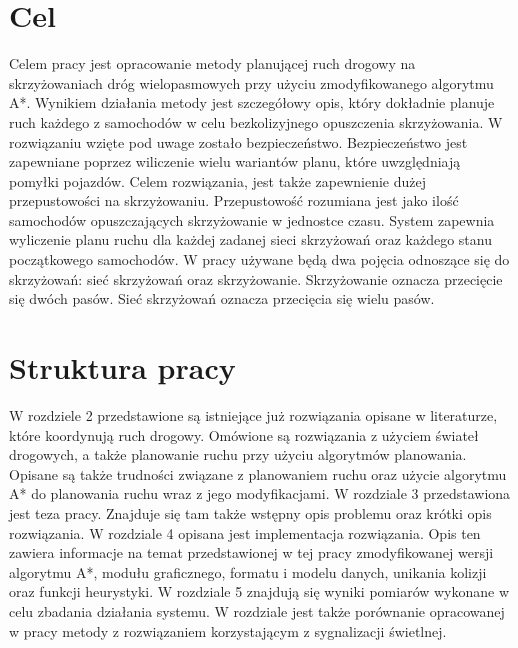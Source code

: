 \section{Cel}

Celem pracy jest opracowanie metody planującej ruch drogowy na skrzyżowaniach dróg wielopasmowych przy użyciu zmodyfikowanego algorytmu A*. Wynikiem działania metody jest szczegółowy opis, który dokładnie planuje ruch każdego z samochodów w celu bezkolizyjnego opuszczenia skrzyżowania. W rozwiązaniu wzięte pod uwage zostało bezpieczeństwo. Bezpieczeństwo jest zapewniane poprzez wiliczenie wielu wariantów planu, które uwzględniają pomyłki pojazdów. Celem rozwiązania, jest także zapewnienie dużej przepustowości na skrzyżowaniu. Przepustowość rozumiana jest jako ilość samochodów opuszczających skrzyżowanie w jednostce czasu. System zapewnia wyliczenie planu ruchu dla każdej zadanej sieci skrzyżowań oraz każdego stanu początkowego samochodów.
\newline
\indent
W pracy używane będą dwa pojęcia odnoszące się do skrzyżowań: sieć skrzyżowań oraz skrzyżowanie. Skrzyżowanie oznacza przecięcie się dwóch pasów. Sieć skrzyżowań oznacza przecięcia się wielu pasów.

\section{Struktura pracy}

W rozdziele 2 przedstawione są istniejące już rozwiązania opisane w literaturze, które koordynują ruch drogowy. Omówione są rozwiązania z użyciem świateł drogowych, a także planowanie ruchu przy użyciu algorytmów planowania. Opisane są także trudności związane z planowaniem ruchu oraz użycie algorytmu A* do planowania ruchu wraz z jego modyfikacjami.
\newline
\indent
W rozdziale 3 przedstawiona jest teza pracy. Znajduje się tam także wstępny opis problemu oraz krótki opis rozwiązania.
\newline
\indent
W rozdziale 4 opisana jest implementacja rozwiązania. Opis ten zawiera informacje na temat przedstawionej w tej pracy zmodyfikowanej wersji algorytmu A*, modułu graficznego, formatu i modelu danych, unikania kolizji oraz funkcji heurystyki.
\newline
\indent
W rozdziale 5 znajdują się wyniki pomiarów wykonane w celu zbadania działania systemu. W rozdziale jest także porównanie opracowanej w pracy metody z rozwiązaniem korzystającym z sygnalizacji świetlnej.
